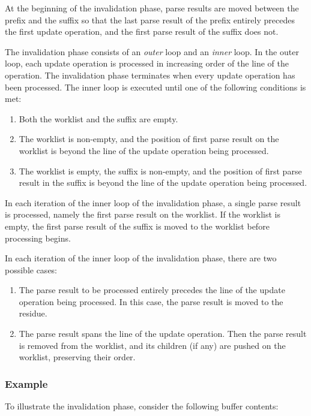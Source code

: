At the beginning of the invalidation phase, parse results are moved
between the prefix and the suffix so that the last parse result of the
prefix entirely precedes the first update operation, and the first
parse result of the suffix does not.

The invalidation phase consists of an \emph{outer} loop and an
\emph{inner} loop.  In the outer loop, each update operation is
processed in increasing order of the line of the operation.  The
invalidation phase terminates when every update operation has been
processed.  The inner loop is executed until one of the following
conditions is met:

\begin{enumerate}
\item Both the worklist and the suffix are empty.
\item The worklist is non-empty, and the position of first parse
  result on the worklist is beyond the line of the update operation
  being processed.
\item The worklist is empty, the suffix is non-empty, and the position
  of first parse result in the suffix is beyond the line of the update
  operation being processed.
\end{enumerate}

In each iteration of the inner loop of the invalidation phase, a
single parse result is processed, namely the first parse result on the
worklist.  If the worklist is empty, the first parse result of the
suffix is moved to the worklist before processing begins.

In each iteration of the inner loop of the invalidation phase, there
are two possible cases:

\begin{enumerate}
\item The parse result to be processed entirely precedes the line of
  the update operation being processed.  In this case, the parse
  result is moved to the residue.
\item The parse result spans the line of the update operation.  Then
  the parse result is removed from the worklist, and its children (if
  any) are pushed on the worklist, preserving their order.
\end{enumerate}

\subsubsection{Example}

To illustrate the invalidation phase, consider the following buffer
contents:

